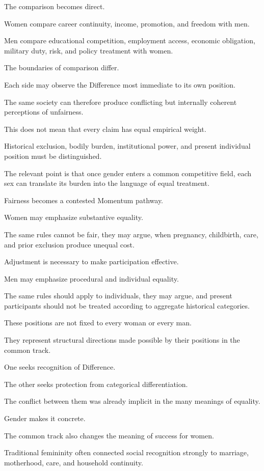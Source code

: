 The comparison becomes direct.

Women compare career continuity, income, promotion, and freedom with men.

Men compare educational competition, employment access, economic obligation, military duty, risk, and policy treatment with women.

The boundaries of comparison differ.

Each side may observe the Difference most immediate to its own position.

The same society can therefore produce conflicting but internally coherent perceptions of unfairness.

This does not mean that every claim has equal empirical weight.

Historical exclusion, bodily burden, institutional power, and present individual position must be distinguished.

The relevant point is that once gender enters a common competitive field, each sex can translate its burden into the language of equal treatment.

Fairness becomes a contested Momentum pathway.

Women may emphasize substantive equality.

The same rules cannot be fair, they may argue, when pregnancy, childbirth, care, and prior exclusion produce unequal cost.

Adjustment is necessary to make participation effective.

Men may emphasize procedural and individual equality.

The same rules should apply to individuals, they may argue, and present participants should not be treated according to aggregate historical categories.

These positions are not fixed to every woman or every man.

They represent structural directions made possible by their positions in the common track.

One seeks recognition of Difference.

The other seeks protection from categorical differentiation.

The conflict between them was already implicit in the many meanings of equality.

Gender makes it concrete.

The common track also changes the meaning of success for women.

Traditional femininity often connected social recognition strongly to marriage, motherhood, care, and household continuity.

